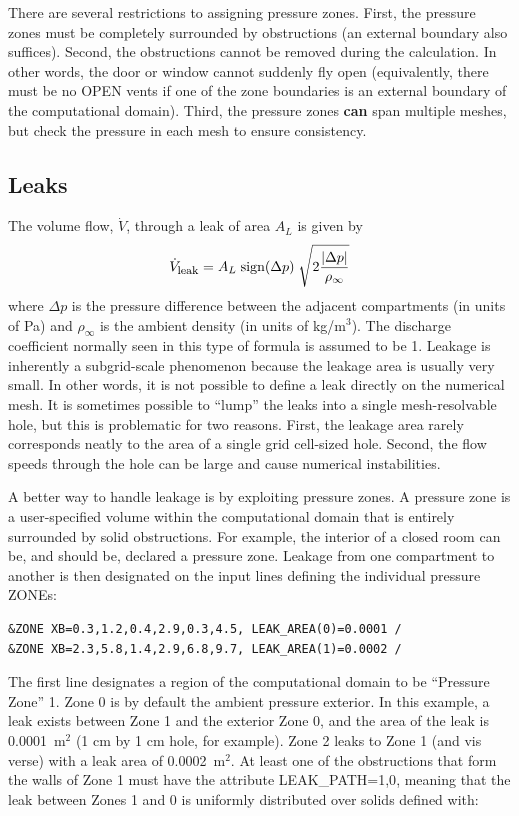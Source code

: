 \documentclass[11pt]{book}
\newcommand{\be}{\begin{equation}}
\newcommand{\ee}{\end{equation}}
\begin{document}
There are several restrictions to assigning pressure zones. First, the pressure zones must be completely surrounded by
obstructions (an external boundary also suffices).
Second, the obstructions cannot be removed during the calculation. In other words, the door or window cannot
suddenly fly open (equivalently, there must be no {\ct OPEN} vents if one of the zone boundaries
is an external boundary of the computational domain).
Third, the pressure zones {\bf can} span multiple meshes,
but check the pressure in each mesh to ensure consistency.


\subsection{Leaks}
\label{info:Leaks}

The volume flow, $\dot{V}$, through a leak of area $A_L$ is given by
\be  \dot{V}_{\hbox{\footnotesize leak}} = A_L \; \hbox{sign} (\Delta p) \; \sqrt{2 \frac{ | \Delta p |}{\rho_\infty}} \ee
where $\Delta p$ is the pressure difference between the adjacent compartments (in units of Pa) and
$\rho_\infty$ is the ambient density (in units of kg/m$^3$). The discharge coefficient normally seen in this type of formula is assumed
to be 1. Leakage is inherently a subgrid-scale phenomenon because the leakage area is usually very small. In other words, it is not possible to define a leak directly on the
numerical mesh. It is sometimes possible to ``lump'' the leaks into a single mesh-resolvable hole, but this is problematic
for two reasons. First, the leakage area rarely corresponds neatly to the area of a single grid cell-sized hole. Second, the
flow speeds through the hole can be large and cause numerical instabilities.

A better way to handle leakage is by exploiting pressure zones. A pressure zone is a user-specified volume within the computational domain that is
entirely surrounded by solid obstructions. For example, the interior of a closed room can be, and should be, declared a pressure zone. Leakage from one
compartment to another is then designated on the input lines defining the individual pressure {\ct ZONE}s:

\footnotesize
\begin{verbatim}
&ZONE XB=0.3,1.2,0.4,2.9,0.3,4.5, LEAK_AREA(0)=0.0001 /
&ZONE XB=2.3,5.8,1.4,2.9,6.8,9.7, LEAK_AREA(1)=0.0002 /
\end{verbatim}
\normalsize

\noindent
The first line designates a region of the computational domain to be ``Pressure Zone'' 1.
Zone 0 is by default the ambient pressure exterior.
In this example, a leak exists between Zone 1 and the exterior Zone 0, and the area of the leak
is 0.0001~m$^2$ (1 cm by 1 cm hole, for example). Zone 2 leaks to Zone 1 (and vis verse)
with a leak area of 0.0002~m$^2$.
At least one of the obstructions that form the walls of Zone 1 must have the attribute
{\ct LEAK\_PATH=1,0}, meaning that the leak between Zones 1 and 0 is uniformly distributed
over solids defined with:
\end{document}

